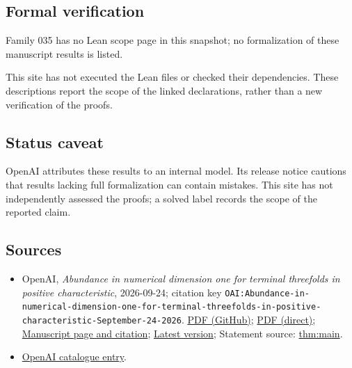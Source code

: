 \documentclass[11pt]{article}
\begin{document}
\subsection{Formal verification}
Family 035 has no Lean scope page in this snapshot; no formalization of these manuscript results is listed.

This site has not executed the Lean files or checked their dependencies. These descriptions report the scope of the linked declarations, rather than a new verification of the proofs.

\subsection{Status caveat}
OpenAI attributes these results to an internal model. Its release notice cautions that results lacking full formalization can contain mistakes. This site has not independently assessed the proofs; a solved label records the scope of the reported claim.

\subsection{Sources}
\begin{itemize}
\item OpenAI, \emph{Abundance in numerical dimension one for terminal threefolds in positive characteristic}, 2026-09-24; citation key \texttt{OAI:Abundance-in-numerical-dimension-one-for-terminal-threefolds-in-positive-characteristic-September-24-2026}. \href{https://github.com/openai/math/blob/adc7f1241b42e322a6451854ab7e4b4c146bf78a/preprints/Abundance-in-numerical-dimension-one-for-terminal-threefolds-in-positive-characteristic-September-24-2026/paper.pdf}{PDF (GitHub)}; \href{https://github.com/openai/math/raw/adc7f1241b42e322a6451854ab7e4b4c146bf78a/preprints/Abundance-in-numerical-dimension-one-for-terminal-threefolds-in-positive-characteristic-September-24-2026/paper.pdf}{PDF (direct)}; \href{https://github.com/openai/math/blob/adc7f1241b42e322a6451854ab7e4b4c146bf78a/preprints/Abundance-in-numerical-dimension-one-for-terminal-threefolds-in-positive-characteristic-September-24-2026/README.md}{Manuscript page and citation}; \href{https://github.com/openai/math/blob/main/preprints/Abundance-in-numerical-dimension-one-for-terminal-threefolds-in-positive-characteristic-September-24-2026/paper.pdf}{Latest version}; Statement source: \href{https://github.com/openai/math/blob/adc7f1241b42e322a6451854ab7e4b4c146bf78a/preprints/Abundance-in-numerical-dimension-one-for-terminal-threefolds-in-positive-characteristic-September-24-2026/build/sections/introduction.tex\#L14}{thm:main}.
\item \href{https://github.com/openai/math/blob/adc7f1241b42e322a6451854ab7e4b4c146bf78a/CONTENTS.md}{OpenAI catalogue entry}.
\end{itemize}
\end{document}
